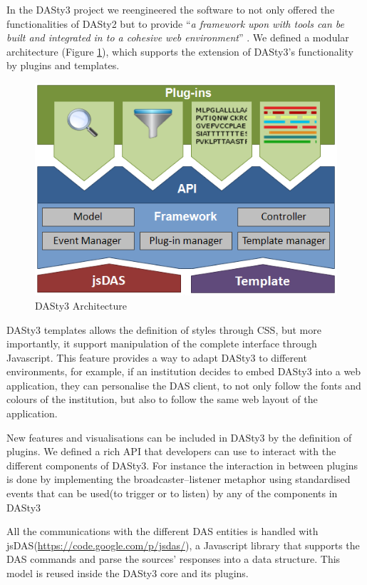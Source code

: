 In the DASty3 project we reengineered the software to not only offered the functionalities of DASty2 but to provide ``\emph{a framework upon with tools can be built and integrated in to a cohesive web environment}'' \cite{VIL2011}. We defined a modular architecture (Figure \ref{fig:dasty-architecture}), which supports the extension of DASty3's functionality by plugins and templates.

\begin{figure}[ht]
\centering
\includegraphics[width=5in]{figures/dasty3_architecture.png} 
\caption{DASty3 Architecture}  \label{fig:dasty-architecture}
\end{figure}

DASty3 templates allows the definition of styles through CSS, but more importantly, it support manipulation of the complete interface through Javascript. This feature provides a way to adapt DASty3 to different environments, for example, if an institution decides to embed DASty3 into a web application, they can personalise the DAS client, to not only follow the fonts and colours of the institution, but also to follow the same web layout of the application.

New features and visualisations can be included in DASty3 by the definition of plugins. We defined a rich API that developers can use to interact with the different components of DASty3. For instance the interaction in between plugins is done by implementing the broadcaster--listener metaphor using standardised events that can be used(to trigger or to listen) by any of the components in DASty3

All the communications with the different DAS entities is handled with jsDAS(\url{https://code.google.com/p/jsdas/}), a Javascript library that supports the DAS commands and parse the sources' responses into a data structure. This model is reused inside the DASty3 core and its plugins.

